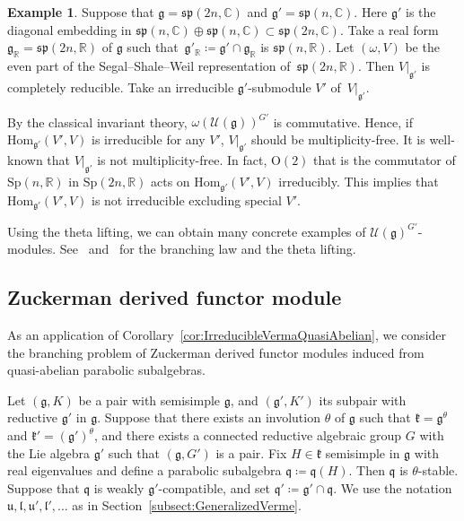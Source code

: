 \documentclass[10pt,a4paper]{amsart}
\numberwithin{equation}{section}
\theoremstyle{definition}
\newtheorem{Example}[Theorem]{Example}
\newcommand{\Hom}{\mathrm{Hom}}
\newcommand{\BasicRing}[1]{\mathbb{#1}}
\newcommand{\RR}{\BasicRing{R}}
\newcommand{\CC}{\BasicRing{C}}
\newcommand{\classicalg}[1]{\mathfrak{#1}}
\newcommand{\lieC}[1]{\mathfrak{#1}}
\newcommand{\lie}[1]{\mathfrak{#1}}
\newcommand{\univ}[1]{\mathcal{U}(\lieC{#1})}
\newcommand{\lieSp}{\classicalg{sp}}
\begin{document}
\begin{Example}\label{ex:NonIrreducible}
	Suppose that $\lie{g} = \lieSp(2n,\CC)$ and $\lie{g'} = \lieSp(n, \CC)$.
	Here $\lie{g'}$ is the diagonal embedding in $\lieSp(n,\CC)\oplus \lieSp(n, \CC) \subset \lieSp(2n,\CC)$.
	Take a real form $\lie{g}_\RR = \lieSp(2n,\RR)$ of $\lie{g}$ such that~${\lie{g}'_\RR \coloneq \lie{g'}\cap \lie{g}_\RR}$ is $\lieSp(n,\RR)$.
	Let $(\omega, V)$ be the even part of the Segal--Shale--Weil representation of~$\lieSp(2n,\RR)$.
	Then $V|_{\lie{g'}}$ is completely reducible.
	Take an irreducible $\lie{g'}$-submodule $V'$ of~$V|_{\lie{g'}}$.

	By the classical invariant theory, $\omega(\univ{g})^{G'}$ is commutative.
	Hence, if $\Hom_{\lie{g'}}(V', V)$ is irreducible for any $V'$, $V|_{\lie{g'}}$ should be multiplicity-free.
	It is well-known that $V|_{\lie{g'}}$ is not multiplicity-free.
	In fact, $\mathrm{O}(2)$ that is the commutator of $\mathrm{Sp}(n,\RR)$ in $\mathrm{Sp}(2n,\RR)$ acts on $\Hom_{\lie{g'}}(V', V)$ irreducibly.
	This implies that $\Hom_{\lie{g'}}(V', V)$ is not irreducible excluding special $V'$.
	
	Using the theta lifting, we can obtain many concrete examples of $\univ{g}^{G'}$-modules.
	See~\cite{KaVe78} and~\cite{Ho89} for the branching law and the theta lifting.
\end{Example}

\subsection{Zuckerman derived functor module}

As an application of Corollary~\ref{cor:IrreducibleVermaQuasiAbelian},
we consider the branching problem of Zuckerman derived functor modules induced from
quasi-abelian parabolic subalgebras.

Let $(\lie{g}, K)$ be a pair with semisimple $\lie{g}$, and $(\lie{g'}, K')$ its subpair with reductive $\lie{g'}$ in $\lie{g}$.
Suppose that there exists an involution $\theta$ of $\lie{g}$ such that $\lie{k} = \lie{g}^\theta$ and $\lie{k'} = (\lie{g'})^\theta$,
and there exists a connected reductive algebraic group $G$ with the Lie algebra $\lie{g'}$ such that $(\lie{g}, G')$ is a pair.
Fix $H \in \lie{k}$ semisimple in $\lie{g}$ with real eigenvalues
and define a parabolic subalgebra $\lie{q}\coloneq \lie{q}(H)$.
Then $\lie{q}$ is $\theta$-stable.
Suppose that $\lie{q}$ is weakly $\lie{g'}$-compatible, and set $\lie{q'}\coloneq \lie{g'}\cap \lie{q}$.
We use the notation $\lie{u}, \lie{l}, \lie{u'}, \lie{l'}, \ldots$ as in Section~\ref{subsect:GeneralizedVerme}.
\end{document}
